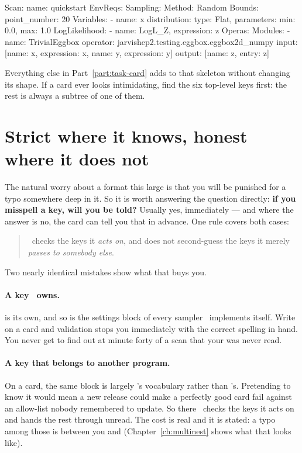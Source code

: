 \begin{yamlwin}
Scan:
  name: quickstart
EnvReqs: {}
Sampling:
  Method: Random
  Bounds:
    point_number: 20
  Variables:
    - name: x
      distribution: {type: Flat, parameters: {min: 0.0, max: 1.0}}
  LogLikelihood:
    - {name: LogL_Z, expression: z}
Operas:
  Modules:
    - name: TrivialEggbox
      operator: jarvishep2.testing.eggbox.eggbox2d_numpy
      input:  [{name: x, expression: x}, {name: y, expression: y}]
      output: [{name: z, entry: z}]
\end{yamlwin}

Everything else in Part~\ref{part:task-card} adds to that skeleton without changing its
shape. If a card ever looks intimidating, find the six top-level keys first: the rest is
always a subtree of one of them.

\section{Strict where it knows, honest where it does not}
\label{sec:zones}

The natural worry about a format this large is that you will be punished for a typo
somewhere deep in it. So it is worth answering the question directly: \textbf{if you
misspell a key, will you be told?} Usually yes, immediately --- and where the answer is
no, the card can tell you that in advance. One rule covers both cases:

\begin{quote}
\Jtwo\ checks the keys it \emph{acts on}, and does not second-guess the keys it merely
\emph{passes to somebody else}.
\end{quote}

Two nearly identical mistakes show what that buys you.

\paragraph{A key \Jtwo\ owns.}  is its own, and so is the settings
block of every sampler \Jtwo\ implements itself. Write  on a
 card and validation stops you immediately with the correct spelling in
hand. You never get to find out at minute forty of a scan that your  was
never read.

\paragraph{A key that belongs to another program.} On a  card, the same
 block is largely 's vocabulary rather than \Jtwo's.
Pretending to know it would mean a new  release could make a perfectly good
card fail against an allow-list nobody remembered to update. So there \Jtwo\ checks the
keys it acts on and hands the rest through unread. The cost is real and it is stated: a
typo among those is between you and  (Chapter~\ref{ch:multinest} shows what
that looks like).

